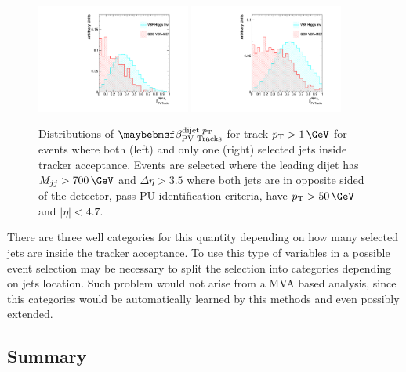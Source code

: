 \begin{figure}[!htb]
\centering
\includegraphics[width=0.45\textwidth]{Chapter06/TrackVariables/Images/BB_Tracks1_TracksERatio.pdf}
\includegraphics[width=0.45\textwidth]{Chapter06/TrackVariables/Images/BE_Tracks1_TracksERatio.pdf}
\caption{Distributions of $\beta_{\text{PV Tracks}}^{\text{dijet }\pt}$ for track $\pt>1\,\GeV$ for events where both (left) and only one (right)  selected jets inside tracker acceptance. Events are selected where the leading dijet has $M_{jj}>700\,\GeV$ and $\Delta\eta>3.5$ where both jets are in opposite sided of the detector, pass \gls{PU} identification criteria, have $\pt>50\,\GeV$ and $|\eta|<4.7$.}
\label{FIGURE:PreparationParkedDataAnalysis_TrackDistributionVariables_Acceptance}
\end{figure}

There are three well categories for this quantity depending on how many selected jets are inside the tracker acceptance. To use this type of variables in a possible event selection may be necessary to split the selection into categories depending on jets location. Such problem would not arise from a \gls{MVA} based analysis, since this categories would be automatically learned by this methods and even possibly extended.

\subsection{Summary}


